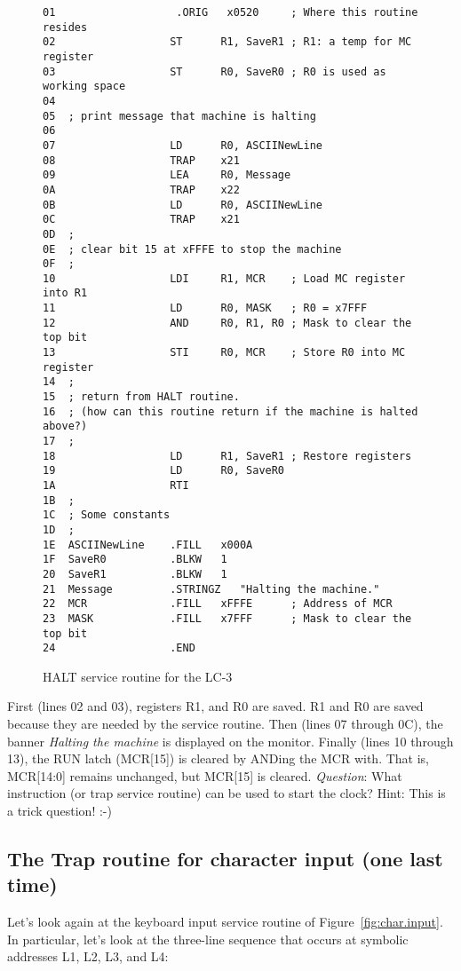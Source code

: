 \documentclass{patt}
\begin{document}
\begin{figure}[h!]
\begin{lstlisting}[style=infigure]
01                   .ORIG   x0520     ; Where this routine resides
02                  ST      R1, SaveR1 ; R1: a temp for MC register
03                  ST      R0, SaveR0 ; R0 is used as working space
04
05  ; print message that machine is halting
06
07                  LD      R0, ASCIINewLine
08                  TRAP    x21
09                  LEA     R0, Message
0A                  TRAP    x22
0B                  LD      R0, ASCIINewLine
0C                  TRAP    x21
0D  ;
0E  ; clear bit 15 at xFFFE to stop the machine
0F  ;
10                  LDI     R1, MCR    ; Load MC register into R1
11                  LD      R0, MASK   ; R0 = x7FFF
12                  AND     R0, R1, R0 ; Mask to clear the top bit
13                  STI     R0, MCR    ; Store R0 into MC register
14  ;
15  ; return from HALT routine.
16  ; (how can this routine return if the machine is halted above?)
17  ;
18                  LD      R1, SaveR1 ; Restore registers
19                  LD      R0, SaveR0
1A                  RTI               
1B  ;
1C  ; Some constants
1D  ;
1E  ASCIINewLine    .FILL   x000A
1F  SaveR0          .BLKW   1
20  SaveR1          .BLKW   1
21  Message         .STRINGZ   "Halting the machine."
22  MCR             .FILL   xFFFE      ; Address of MCR
23  MASK            .FILL   x7FFF      ; Mask to clear the top bit
24                  .END
\end{lstlisting}
\caption{HALT service routine for the LC-3}
\label{fig:halt.routine}
\end{figure}


First (lines 02 and 03), registers R1, and R0 are saved.  R1
and R0 are saved because they are needed by the service routine.  
Then (lines 07 through 0C), the banner {\em
Halting the machine} is displayed on the monitor.  Finally (lines 10
through 13), the RUN latch (MCR[15]) is cleared by ANDing the MCR
with.  That is, MCR[14:0]
remains unchanged, but MCR[15] is cleared. {\em Question}: What
instruction (or trap service routine) can be used to start the clock?
Hint: This is a trick question!  :-)

\FloatBarrier
\subsection{The Trap routine for character input (one last time)}

Let's look again at the keyboard input service routine of
Figure~\ref{fig:char.input}.  In particular, let's look at the
three-line sequence that occurs at symbolic addresses L1, L2, L3, and
L4:
\end{document}
